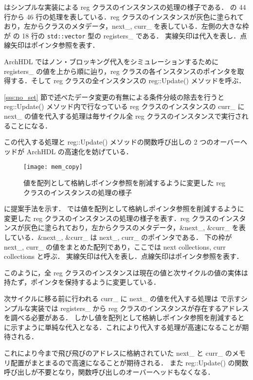  はシンプルな実装による reg クラスのインスタンスの処理の様子である．
の 44 行から 46 行の処理を表している．reg クラスのインスタンスが灰色に塗られており，左からクラスのメタデータ，next\_, curr\_
を表している．左側の大きな枠が の 18 行の \verb`std::vector` 型の registers\_ である．
実線矢印は代入を表し．点線矢印はポインタ参照を表す．

ArchHDL ではノン・ブロッキング代入をシミュレーションするために registers\_ の値を上から順に辿り，reg クラスの各インスタンスのポインタを取得する．そして reg クラスの全インスタンスの reg::Update() メソッドを呼ぶ．

\ref{sss:no_set} 節で述べたデータ変更の有無による条件分岐の除去を行うと
reg::Update() メソッド内で行なっている reg
クラスのインスタンスの curr\_ に next\_ の値を代入する処理は毎サイクル全
reg クラスのインスタンスで実行されることになる．

この代入する処理と reg::Update() メソッドの関数呼び出しの 2
つのオーバーヘッドが ArchHDL の高速化を妨げている．

\begin{figure}[t]
 \centering
 \texttt{[image: mem\_copy]}
 \caption{値を配列として格納しポインタ参照を削減するように変更した reg クラスのインスタンスの処理の様子}
 \label{fig:mem_copy}
\end{figure}

 に提案手法を示す． では値を配列として格納しポインタ参照を削減するように変更した reg クラスのインスタンスの処理の様子を表す．reg クラスのインスタンスが灰色に塗られており，左からクラスのメタデータ，\&next\_, \&curr\_ を表している．\&next\_, \&curr\_ は next\_, curr\_ のポインタである．
下の枠が next\_, curr\_ の値をまとめた配列であり，ここでは next collections, curr collections と呼ぶ．
実線矢印は代入を表し．点線矢印はポインタ参照を表す．

このように，全 reg クラスのインスタンスは現在の値と次サイクルの値の実体は持たず，ポインタを保持するように変更している．

次サイクルに移る前に行われる curr\_ に next\_ の値を代入する処理は  で示すシンプルな実装では registers\_ から reg クラスのインスタンスが存在するアドレスを調べる必要がある．
しかし値を配列として格納しポインタ参照を削減すると  に示すように単純な代入となる．これにより代入する処理が高速になることが期待される．

これにより今まで飛び飛びのアドレスに格納されていた next\_ と curr\_ のメモリ配置がまとまるので高速になることが期待される．
また reg::Update() の関数呼び出しが不要となり，関数呼び出しのオーバーヘッドもなくなる．

